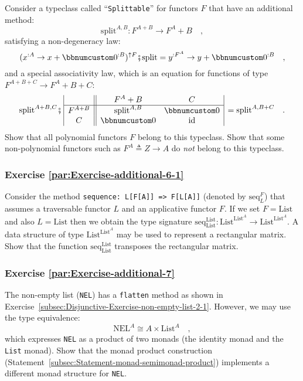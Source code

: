 Consider a typeclass called \textsf{``}\lstinline!Splittable!\textsf{''} for functors
$F$ that have an additional method:
\[
\text{split}^{A,B}:F^{A+B}\rightarrow F^{A}+B\quad,
\]
satisfying a non-degeneracy
law:
\[
(x^{:A}\rightarrow x+\bbnum 0^{:B})^{\uparrow F}\bef\text{split}=y^{:F^{A}}\rightarrow y+\bbnum 0^{:B}\quad,
\]
and a special associativity law,
which is an equation for functions of type $F^{A+B+C}\rightarrow F^{A}+B+C$:
\[
\text{split}^{A+B,C}\bef\,\begin{array}{|c||cc|}
 & F^{A}+B & C\\
\hline F^{A+B} & \text{split}^{A,B} & \bbnum 0\\
C & \bbnum 0 & \text{id}
\end{array}\,=\text{split}^{A,B+C}\quad.
\]
Show that all polynomial functors $F$ belong to this typeclass. Show
that some non-polynomial functors such as $F^{A}\triangleq Z\rightarrow A$
do \emph{not} belong to this typeclass.

\subsubsection{Exercise \label{par:Exercise-additional-6-1}\ref{par:Exercise-additional-6-1}}

Consider the method \lstinline!sequence: L[F[A]] => F[L[A]]! (denoted
by $\text{seq}_{L}^{F}$) that assumes a traversable functor $L$
and an applicative functor $F$. If we set $F=\text{List}$ and also
$L=\text{List}$ then we obtain the type signature $\text{seq}_{\text{List}}^{\text{List}}:\text{List}^{\text{List}^{A}}\rightarrow\text{List}^{\text{List}^{A}}$.
A data structure of type $\text{List}^{\text{List}^{A}}$ may be used
to represent a rectangular matrix. Show that the function $\text{seq}_{\text{List}}^{\text{List}}$
transposes the rectangular matrix.

\subsubsection{Exercise \label{par:Exercise-additional-7}\ref{par:Exercise-additional-7}}

The non-empty list (\lstinline!NEL!) has a \lstinline!flatten! method
as shown in Exercise~\ref{subsec:Disjunctive-Exercise-non-empty-list-2-1}.
However, we may use the type equivalence:
\[
\text{NEL}^{A}\cong A\times\text{List}^{A}\quad,
\]
which expresses \lstinline!NEL! as a product of two monads (the identity
monad and the \lstinline!List! monad). Show that the monad product
construction (Statement~\ref{subsec:Statement-monad-semimonad-product})
implements a different monad structure for \lstinline!NEL!.

